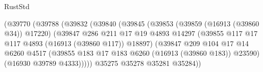 \begin{lexlean}{RustStd}
\begin{coremodule}
                                            (@39770
                                              (@39788
                                                (@39832
                                                  (@39840
                                                    (@39845
                                                      (@39853
                                                        (@39859 (@16913 (@39860 @34)) @17220)
                                                        (@39847
                                                          @286
                                                          @211
                                                          @17
                                                          @19
                                                          @4893
                                                          @14297
                                                          (@39855
                                                            @117
                                                            @17
                                                            @117
                                                            @4893
                                                            (@16913 (@39860 @117))
                                                            @18897)
                                                          (@39847
                                                            @209
                                                            @104
                                                            @17
                                                            @14
                                                            @6260
                                                            @4517
                                                            (@39855
                                                              @183
                                                              @17
                                                              @183
                                                              @6260
                                                              (@16913 (@39860 @183))
                                                              @23590)
                                                            (@16930 @39789 @4333)))))
                                                    @35275
                                                    @35278
                                                    @35281
                                                    @35284))

\end{coremodule}
\end{lexlean}
